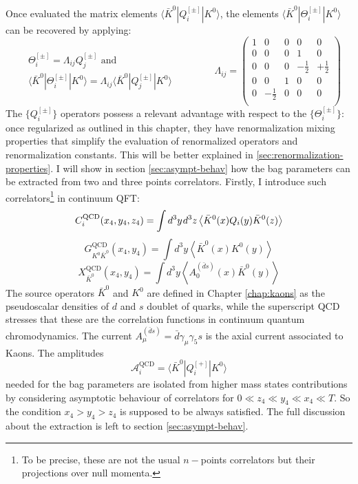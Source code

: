 \documentclass[english, LaM, oneside, noexaminfo]{sapthesis}
\newcommand{\la}{\langle}
\newcommand{\ra}{\rangle}
\begin{document}
Once evaluated the matrix elements $\la \bar K^0 | Q_i^{[\pm]} | K^0 \ra$, the elements $\la \bar K^0 | \Theta_i^{[\pm]} | K^0 \ra$ can be recovered by applying:
\begin{equation*}
    \begin{split}
        & \Theta_i^{[\pm]} = \Lambda_{ij} Q_j^{[\pm]}  \text{ and}\\
        & \la \bar K^0 | \Theta_i^{[\pm]} | K^0 \ra =\Lambda_{ij} \la \bar K^0 | Q_j^{[\pm]} | K^0 \ra
    \end{split}
    \qquad\qquad
    \Lambda_{ij} = 
    \begin{pmatrix}
        1 & 0 & 0 & 0 & 0 \\
        0 & 0 & 0 & 1 & 0 \\
        0 & 0 & 0 & -\frac{1}{2} & +\frac{1}{2} \\
        0 & 0 & 1 & 0 & 0 \\
        0 & -\frac{1}{2} & 0 & 0 & 0 \\
    \end{pmatrix}
\end{equation*}
The $\{Q_i^{[\pm]}\}$ operators possess a relevant advantage with respect to the $\{\Theta_i^{[\pm]}\}$:
once regularized as outlined in this chapter, they have renormalization mixing properties that simplify the evaluation of renormalized operators and renormalization constants.
This will be better explained in \ref{sec:renormalization-properties}.
\newline
I will show in section \ref{sec:asympt-behav} how the bag parameters can be extracted from two and three points correlators.
Firstly, I introduce such correlators\footnote{To be precise, these are not the usual $n-$points correlators but their projections over null momenta.} in continuum QFT:
\begin{equation}\label{eq:3pts-correlators}
    C_i^\text{QCD}(x_4,y_4,z_4) = \int d^3y \hspace*{.3mm} d^3z \left\la \bar K^0(x) Q_i(y) \bar K^0(z) \right\ra
\end{equation}
\begin{equation*}
    G_{K^0 \bar K^0}^\text{QCD}(x_4,y_4) = \int d^3y \left\la \bar K^0(x) K^0(y) \right\ra
\end{equation*}
\begin{equation*}
    X_{\bar K^0}^\text{QCD}(x_4,y_4) = \int d^3y \left\la A_0^{(\bar d s)}(x) \bar K^0(y) \right\ra
\end{equation*}
The source operators $\bar K^0$ and $K^0$ are defined in Chapter \ref{chap:kaons} as the pseudoscalar densities of $d$ and $s$ doublet of quarks, while the superscript QCD stresses that these are the correlation functions in continuum quantum chromodynamics.
The current $A_\mu^{(\bar d s)} = \bar d \gamma_\mu \gamma_5 s $ is the axial current associated to Kaons. 
The amplitudes $$\mathcal{A}_i^\text{QCD} = \la \bar K^0 | Q_i^{[+]} | K^0 \ra$$ needed for the bag parameters are isolated from higher mass states contributions by considering asymptotic behaviour of correlators for $0 \ll z_4 \ll y_4 \ll x_4 \ll T$.
So the condition $x_4 > y_4 > z_4$ is supposed to be always satisfied.
The full discussion about the extraction is left to section \ref{sec:asympt-behav}.
\end{document}
